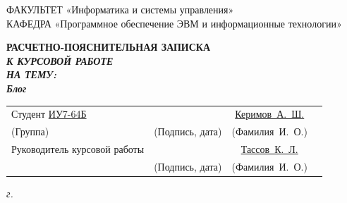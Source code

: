 \begin{titlepage}
	{\doublespacing\small\raggedright
		ФАКУЛЬТЕТ \hspace{28mm} «Информатика и системы управления» \\
		КАФЕДРА \hspace{9mm} «Программное обеспечение ЭВМ и информационные технологии» \\
	}

	\vspace{20mm}

	{\large\bfseries
		РАСЧЕТНО-ПОЯСНИТЕЛЬНАЯ ЗАПИСКА \\
		{\itshape
			К КУРСОВОЙ РАБОТЕ \\
			НА ТЕМУ: \\
			Блог \\
		}
	}

	\vspace{70mm}

	\begin{tabular}{p{} c c c}
		Студент \underline{ ИУ7-64Б }          & \underline{\hspace{35mm}}     & \underline{Керимов~А.~Ш.}     \\ [-0.6em]
		{\hspace{23.5mm} \scriptsize (Группа)} & {\scriptsize (Подпись, дата)} & {\scriptsize (Фамилия~И.~О.)} \\
		Руководитель курсовой работы           & \underline{\hspace{35mm}}     & \underline{ Тассов~К.~Л. }    \\ [-0.6em]
		                                       & {\scriptsize (Подпись, дата)} & {\scriptsize (Фамилия~И.~О.)} \\
	\end{tabular}

	\vfill

	\textit{{\the\year} г.}
\end{titlepage}

\setcounter{page}{2}
